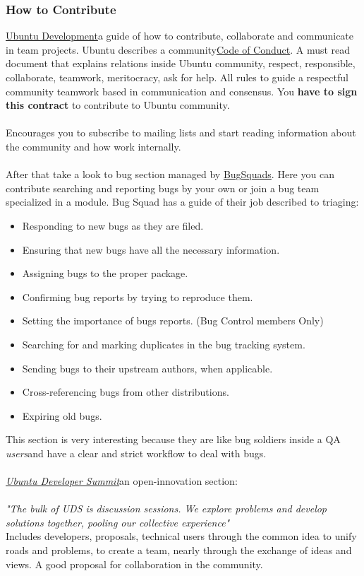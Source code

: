 \subsubsection{ How to Contribute}\href{https://wiki.ubuntu.com/UbuntuDevelopment}{Ubuntu Development}\nolinebreakdescribes a guide of how to contribute, collaborate and communicate in team projects. Ubuntu describes a community\nolinebreak\href{http://www.ubuntu.com/project/about-ubuntu/conduct}{Code of Conduct}. A must read document that explains relations inside Ubuntu community, respect, responsible, collaborate, teamwork, meritocracy, ask for help. All rules to guide a respectful community teamwork based in communication and consensus. You \textbf{have to sign this contract} to contribute to Ubuntu community.
\\
\\ Encourages you to subscribe to mailing lists and start reading information about the community and how work internally.
\\
\\ After that take a look to bug section managed by \href{https://wiki.ubuntu.com/BugSquad}{BugSquads}. Here you can contribute searching and reporting bugs by your own or join a bug team specialized in a module. Bug Squad has a guide of their job described to triaging:
\\
\begin{itemize}
	\item Responding to new bugs as they are filed.
	\item Ensuring that new bugs have all the necessary information.
	\item Assigning bugs to the proper package.
	\item Confirming bug reports by trying to reproduce them.
	\item Setting the importance of bugs reports. (Bug Control members Only)
	\item Searching for and marking duplicates in the bug tracking system.
	\item Sending bugs to their upstream authors, when applicable.
	\item Cross-referencing bugs from other distributions.
	\item Expiring old bugs.
\end{itemize} This section is very interesting because they are like bug soldiers inside a QA \textit{users}\nolinebreakteam and have a clear and strict workflow to deal with bugs.
\\
\\\textit{\href{http://uds.ubuntu.com/}{Ubuntu Developer Summit}}\nolinebreakis an open-innovation section:
\\\textit{
\\}\textit{"The bulk of UDS is discussion sessions. We explore problems and develop solutions together, pooling our collective experience"}
\\ Includes developers, proposals, technical users through the common idea to unify roads and problems, to create a team, nearly through the exchange of ideas and views. A good proposal for collaboration in the community.
\\